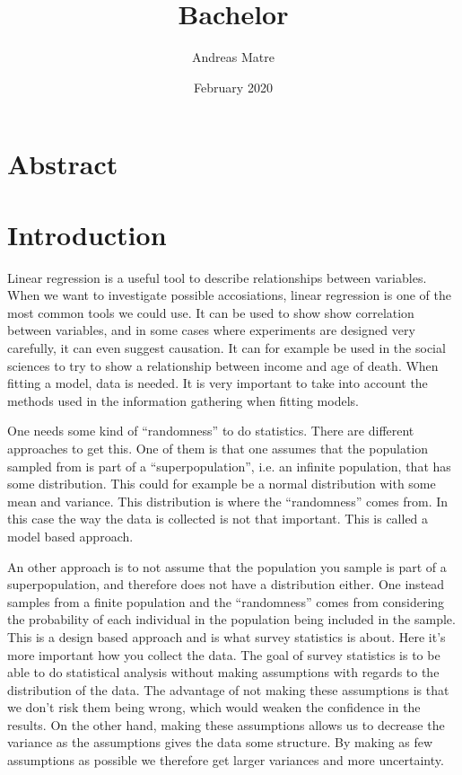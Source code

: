\documentclass{article}
\title{Bachelor}
\author{Andreas Matre}
\date{February 2020}
\begin{document}
\newtheorem{definition}{Definition}[section]
\newtheorem{theorem}{Theorem}
\newtheorem{example}{Example}[section]


\maketitle

\section*{Abstract}

\tableofcontents

\section{Introduction}

Linear regression is a useful tool to describe relationships between variables.
When we want to investigate possible accosiations, linear regression
is one of the most common tools we could use. It can be used to show show correlation between
variables, and in some cases where experiments are designed very carefully, it can even suggest causation.
It can for example be used in the social sciences to try to show a relationship
between income and age of death.
When fitting a model, data is needed. It is very important to take into account the methods used in
the information gathering when fitting models.

One needs some kind of ``randomness'' to do statistics. There are different
approaches to get this.
One of them is that one assumes that the population sampled from is part of a ``superpopulation'', i.e. an
infinite population, that has some distribution. This could for example be a
normal distribution with some mean and variance.  This distribution is where the
``randomness'' comes from. In this case the way the data
is collected is not that important. This is called a model based approach.

An other approach is to not assume that the population you sample is part of a
superpopulation, and therefore does not have a distribution either.
One instead samples from a finite population and the ``randomness'' comes from
considering the probability of each individual in the population being included
in the sample. This is a design based approach and is what survey statistics is about. Here it's more important how
you collect the data.
The goal of survey statistics is to be able to do statistical analysis without
making assumptions with regards to the distribution of the data. The advantage
of not making these assumptions is that we don't risk them being wrong, which
would weaken the confidence in the results. On the other hand,
making these assumptions allows us to decrease the variance as the assumptions
gives the data some structure. By making as few assumptions as possible we
therefore get larger variances and more uncertainty.
\end{document}
